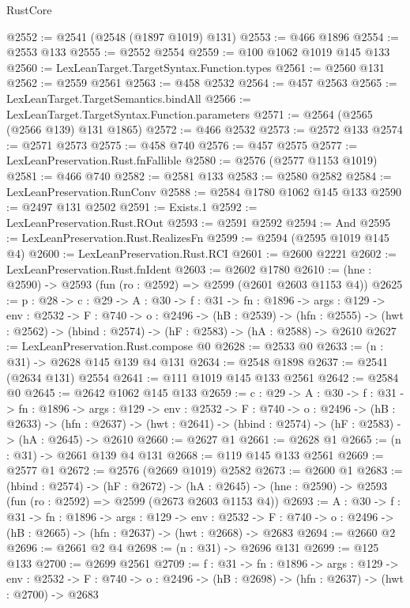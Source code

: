 \begin{lexlean}{RustCore}
\begin{coremodule}
@2552 := @2541 (@2548 (@1897 @1019) @131)
@2553 := @466 @1896
@2554 := @2553 @133
@2555 := @2552 @2554
@2559 := @100 @1062 @1019 @145 @133
@2560 := LexLeanTarget.TargetSyntax.Function.types
@2561 := @2560 @131
@2562 := @2559 @2561
@2563 := @458 @2532
@2564 := @457 @2563
@2565 := LexLeanTarget.TargetSemantics.bindAll
@2566 := LexLeanTarget.TargetSyntax.Function.parameters
@2571 := @2564 (@2565 (@2566 @139) @131 @1865)
@2572 := @466 @2532
@2573 := @2572 @133
@2574 := @2571 @2573
@2575 := @458 @740
@2576 := @457 @2575
@2577 := LexLeanPreservation.Rust.fnFallible
@2580 := @2576 (@2577 @1153 @1019)
@2581 := @466 @740
@2582 := @2581 @133
@2583 := @2580 @2582
@2584 := LexLeanPreservation.RunConv
@2588 := @2584 @1780 @1062 @145 @133
@2590 := @2497 @131 @2502
@2591 := Exists.{1}
@2592 := LexLeanPreservation.Rust.ROut
@2593 := @2591 @2592
@2594 := And
@2595 := LexLeanPreservation.Rust.RealizesFn
@2599 := @2594 (@2595 @1019 @145 @4)
@2600 := LexLeanPreservation.Rust.RCI
@2601 := @2600 @2221
@2602 := LexLeanPreservation.Rust.fnIdent
@2603 := @2602 @1780
@2610 := (hne : @2590) -> @2593 (fun (ro : @2592) => @2599 (@2601 @2603 @1153 @4))
@2625 := {p : @28} ->
  {c : @29} ->
  {A : @30} ->
  {f : @31} ->
  {fn : @1896} ->
  {args : @129} ->
  {env : @2532} ->
  {F : @740} ->
  {o : @2496} ->
  (hB : @2539) ->
  (hfn : @2555) -> (hwt : @2562) -> (hbind : @2574) -> (hF : @2583) -> (hA : @2588) -> @2610
@2627 := LexLeanPreservation.Rust.compose @0
@2628 := @2533 @0
@2633 := (n : @31) -> @2628 @145 @139 @4 @131
@2634 := @2548 @1898
@2637 := @2541 (@2634 @131) @2554
@2641 := @111 @1019 @145 @133 @2561
@2642 := @2584 @0
@2645 := @2642 @1062 @145 @133
@2659 := {c : @29} ->
  {A : @30} ->
  {f : @31} ->
  {fn : @1896} ->
  {args : @129} ->
  {env : @2532} ->
  {F : @740} ->
  {o : @2496} ->
  (hB : @2633) ->
  (hfn : @2637) -> (hwt : @2641) -> (hbind : @2574) -> (hF : @2583) -> (hA : @2645) -> @2610
@2660 := @2627 @1
@2661 := @2628 @1
@2665 := (n : @31) -> @2661 @139 @4 @131
@2668 := @119 @145 @133 @2561
@2669 := @2577 @1
@2672 := @2576 (@2669 @1019) @2582
@2673 := @2600 @1
@2683 := (hbind : @2574) ->
  (hF : @2672) ->
  (hA : @2645) -> (hne : @2590) -> @2593 (fun (ro : @2592) => @2599 (@2673 @2603 @1153 @4))
@2693 := {A : @30} ->
  {f : @31} ->
  {fn : @1896} ->
  {args : @129} ->
  {env : @2532} ->
  {F : @740} -> {o : @2496} -> (hB : @2665) -> (hfn : @2637) -> (hwt : @2668) -> @2683
@2694 := @2660 @2
@2696 := @2661 @2 @4
@2698 := (n : @31) -> @2696 @131
@2699 := @125 @133
@2700 := @2699 @2561
@2709 := {f : @31} ->
  {fn : @1896} ->
  {args : @129} ->
  {env : @2532} ->
  {F : @740} -> {o : @2496} -> (hB : @2698) -> (hfn : @2637) -> (hwt : @2700) -> @2683

\end{coremodule}
\end{lexlean}
